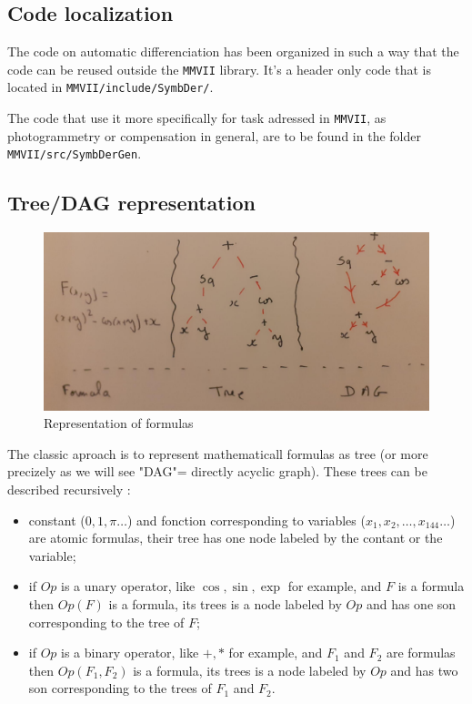 \subsection{Code localization}

The code on automatic differenciation has been organized in such a way that 
the code can be reused outside the {\tt MMVII} library. It's a header only code
that is located in {\tt MMVII/include/SymbDer/}.


The code that use it more specifically for task adressed in  {\tt MMVII},
as photogrammetry or compensation in general, are to be found in the
folder  {\tt MMVII/src/SymbDerGen}.


\subsection{Tree/DAG representation}

\begin{figure}
\centering
\includegraphics[width=12cm]{Programmer/ImagesProg/Tree.jpg}
\caption{Representation of formulas}
\label{fig:TreeFormula}
\end{figure}

The classic aproach is to represent mathematicall formulas as tree (or more precizely 
as we will see "DAG"=  directly acyclic graph).
These trees can be described recursively :

\begin{itemize}
   \item  constant ($0,1,\pi \dots$)  and fonction corresponding to variables ($x_1,x_2,\dots ,x_{144} \dots$)
          are  atomic formulas, their tree has one node labeled by the contant or the variable;

   \item if $Op$ is a unary operator, like $\cos, \sin, \exp $ for example,  and $F$ is a formula then $Op(F)$ is a 
         formula, its trees is a node labeled by $Op$ and has one son corresponding to the tree of $F$;

   \item if $Op$ is a binary operator, like $+,* $ for example,  and $F_1$  and $F_2$ are  formulas then $Op(F_1,F_2)$ is a 
         formula,  its trees is a node labeled by $Op$ and has two son corresponding to the trees of $F_1$ and $F_2$.
\end{itemize}


